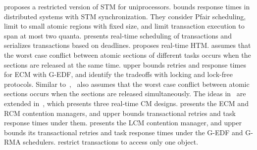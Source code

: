 \documentclass[letter]{sig-alternate}
\begin{document}
\cite{manson2006preemptible} proposes a restricted version of STM for uniprocessors. %
\cite{fahmy2009bounding} bounds response times in distributed  systems with STM synchronization. They consider Pfair scheduling, limit to small atomic regions with fixed size, and limit transaction execution to span at most two quanta. 
\cite{sarni2009real} presents real-time scheduling of transactions and serializes transactions based on deadlines. 
\cite{schoeberl2010rttm} proposes real-time HTM. \cite{schoeberl2010rttm} assumes that the worst case conflict between atomic sections of different tasks occurs when the sections are released at the same time. 
\cite{key-1} upper bounds retries and response times for ECM with G-EDF, and identify the tradeoffs with locking and lock-free protocols. Similar to~\cite{schoeberl2010rttm},~\cite{key-1} also assumes that the worst case conflict between atomic sections occurs when the sections are released simultaneously. The ideas in~\cite{key-1} are extended in~\cite{barrosmanaging}, which presents three real-time CM designs. 
\cite{stmconcurrencycontrol:emsoft11} presents the ECM and RCM contention managers, and upper bounds transactional retries and task response times under them. 
%
\cite{lcmdac2012} presents the LCM contention manager, and upper bounds its transactional retries and task response times under the G-EDF and G-RMA schedulers. 
\cite{lcmdac2012,stmconcurrencycontrol:emsoft11} restrict transactions to access only one object. 
\end{document}
